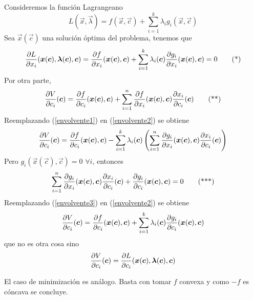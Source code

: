 \begin{demostracion}
Consideremos la funci\'on Lagrangeano
\begin{equation*}
L(\vec{x},\vec{\lambda}) = f(\vec{x},\vec{c}) + \sum_{i=1}^k \lambda_i g_i(\vec{x},\vec{c})
\end{equation*}
Sea $\vec{x}(\vec{c})$ una soluci\'on \'optima del problema, tenemos que
\begin{gather}\label{envolvente1}
\frac{\partial L}{\partial x_i}(\boldsymbol{x}(\boldsymbol{c}),\boldsymbol{\lambda}(\boldsymbol{c}),\boldsymbol{c}) = \frac{\partial f}{\partial x_i}(\boldsymbol{x}(\boldsymbol{c}),\boldsymbol{c}) + \sum_{i=1}^k \lambda_i(\boldsymbol{c}) \frac{\partial g_i}{\partial x_i}(\boldsymbol{x}(\boldsymbol{c}),\boldsymbol{c}) = 0 \tag{*}
\end{gather}
Por otra parte,
\begin{gather} \label{envolvente2}
\frac{\partial V}{\partial c_i}(\boldsymbol{c}) = \frac{\partial f}{\partial c_i} (\boldsymbol{x}(\boldsymbol{c}),\boldsymbol{c}) + \sum_{i=1}^n \frac{\partial f}{\partial x_i}(\boldsymbol{x}(\boldsymbol{c}),\boldsymbol{c}) \frac{\partial x_i}{\partial c_i}(\boldsymbol{c}) \tag{**}
\end{gather}
Reemplazando (\ref{envolvente1}) en (\ref{envolvente2}) se obtiene
\begin{equation*}
\frac{\partial V}{\partial c_i}(\boldsymbol{c}) = \frac{\partial f}{\partial c_i}(\boldsymbol{x}(\boldsymbol{c}),\boldsymbol{c}) - \sum_{i=1}^k \lambda_i(\boldsymbol{c}) \left(\sum_{i=1}^n \frac{\partial g_i}{\partial x_i} (\boldsymbol{x}(\boldsymbol{c}),\boldsymbol{c}) \frac{\partial x_i}{\partial c_i}(\boldsymbol{c}) \right)
\end{equation*}
Pero $g_i(\vec{x}(\vec{c}),\vec{c})=0$ $\forall i$, entonces 
\begin{gather}\label{envolvente3}
\sum_{i=1}^n \frac{\partial g_i}{\partial x_i} (\boldsymbol{x}(\boldsymbol{c}),\boldsymbol{c}) \frac{\partial x_i}{\partial c_i}(\boldsymbol{c}) + \frac{\partial g_i}{\partial c_i}(\boldsymbol{x}(\boldsymbol{c}),\boldsymbol{c}) = 0 \tag{***}
\end{gather}
Reemplazando (\ref{envolvente3}) en (\ref{envolvente2}) se obtiene
\begin{equation*}
\frac{\partial V}{\partial c_i}(\boldsymbol{c}) = \frac{\partial f}{\partial c_i}(\boldsymbol{x}(\boldsymbol{c}),\boldsymbol{c}) + \sum_{i=1}^k \lambda_i (\boldsymbol{c}) \frac{\partial g_i}{\partial c_i} (\boldsymbol{x}(\boldsymbol{c}),\boldsymbol{c})
\end{equation*}
que no es otra cosa sino
\begin{equation*}
\frac{\partial V}{\partial c_i}(\boldsymbol{c}) = \frac{\partial L}{\partial c_i}(\boldsymbol{x}(\boldsymbol{c}),\boldsymbol{\lambda}(\boldsymbol{c}),\boldsymbol{c})
\end{equation*}
\end{demostracion}

\begin{nota}
El caso de minimizaci\'on es an\'alogo. Basta con tomar $f$ convexa y como $-f$ es c\'oncava se concluye.
\end{nota}

